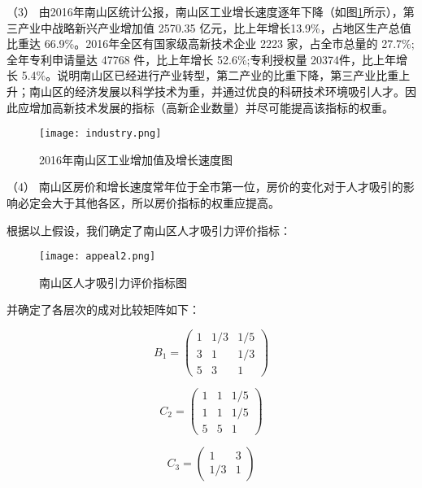\documentclass[withoutpreface,bwprint]{cumcmthesis} %
\begin{document}
（3）	由2016年南山区统计公报，南山区工业增长速度逐年下降（如图\ref{tab:2016年南山区工业增加值及增长速度图}所示），第三产业中战略新兴产业增加值 2570.35 亿元，比上年增长13.9\%，占地区生产总值比重达 66.9\%。2016年全区有国家级高新技术企业 2223 家，占全市总量的 27.7\%; 全年专利申请量达 47768 件，比上年增长 52.6\%;专利授权量 20374件，比上年增长 5.4\%。说明南山区已经进行产业转型，第二产业的比重下降，第三产业比重上升；南山区的经济发展以科学技术为重，并通过优良的科研技术环境吸引人才。因此应增加高新技术发展的指标（高新企业数量）并尽可能提高该指标的权重。
\begin{figure}[!h]
\centering
\texttt{[image: industry.png]}
\caption{2016年南山区工业增加值及增长速度图}
\label{tab:2016年南山区工业增加值及增长速度图}
\end{figure}
 
  

（4）	南山区房价和增长速度常年位于全市第一位，房价的变化对于人才吸引的影响必定会大于其他各区，所以房价指标的权重应提高。

根据以上假设，我们确定了南山区人才吸引力评价指标：
\begin{figure}[!h]
\centering
\texttt{[image: appeal2.png]}
\caption{南山区人才吸引力评价指标图}
\label{tab:南山区人才吸引力评价指标图}
\end{figure}
 
\newpage  
并确定了各层次的成对比较矩阵如下：
     
\begin{equation}{B_1} = \left( {\begin{array}{*{20}{c}}
1&{1/3}&{1/5}\\
3&1&{1/3}\\
5&3&1
\end{array}} \right)\end{equation}    
   
\begin{equation}{C_2} = \left( {\begin{array}{*{20}{c}}
1&1&{1/5}\\
1&1&{1/5}\\
5&5&1
\end{array}} \right)\end{equation}    
  
\begin{equation}{C_3} = \left( {\begin{array}{*{20}{c}}
1&3\\
{1/3}&1
\end{array}} \right)\end{equation} 
\end{document}
